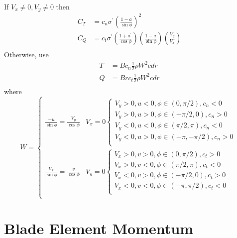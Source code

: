 If $V_x \ne 0, V_y \ne 0$ then
\begin{equation}
\begin{aligned}
C_T &= c_n \sigma^\prime \left(\frac{1-a}{\sin\phi}\right)^2 \\
C_Q &= c_t \sigma^\prime \left(\frac{1 + a^\prime}{\cos\phi}\right)\left(\frac{1 - a}{\sin\phi}\right)\left(\frac{V_y}{V_x}\right)\\
\end{aligned}
\end{equation}
Otherwise, use
\begin{equation}
\begin{aligned}
    T &= B c_n \frac{1}{2}\rho W^2 c dr \\
    Q &= B r c_t \frac{1}{2}\rho W^2 c dr \\
\end{aligned}
\end{equation}
where
\begin{equation}
    W =
    \begin{cases}
        \frac{-u}{\sin\phi} = \frac{V_y}{\cos\phi} & V_x = 0
        \begin{cases}
            V_y > 0, u < 0, \phi \in (0, \pi/2), c_n < 0\\
            V_y > 0, u > 0, \phi \in (-\pi/2, 0), c_n > 0\\
            V_y < 0, u < 0, \phi \in (\pi/2, \pi), c_n < 0\\
            V_y < 0, u > 0, \phi \in (-\pi, -\pi/2), c_n > 0\\
        \end{cases}\\
        \frac{V_x}{\sin\phi} = \frac{v}{\cos\phi} & V_y = 0
        \begin{cases}
            V_x > 0, v > 0, \phi \in (0, \pi/2), c_t > 0\\
            V_x > 0, v < 0, \phi \in (\pi/2, \pi), c_t < 0\\
            V_x < 0, v > 0, \phi \in (-\pi/2, 0), c_t > 0\\
            V_x < 0, v < 0, \phi \in (-\pi, \pi/2), c_t < 0\\
        \end{cases}\\
    \end{cases}
    \label{eq:Wopt}
\end{equation}




\section{Blade Element Momentum}

